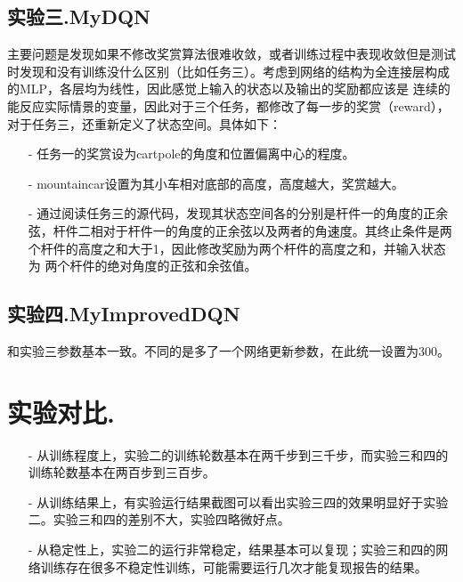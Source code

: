 \documentclass[a4paper,UTF8]{article}
\theoremstyle{definition}
\begin{document}
    \subsection{实验三.MyDQN}
    主要问题是发现如果不修改奖赏算法很难收敛，或者训练过程中表现收敛但是测试时发现和没有训练没什么区别（比如任务三）。考虑到网络的结构为全连接层构成的MLP，各层均为线性，因此感觉上输入的状态以及输出的奖励都应该是
    连续的能反应实际情景的变量，因此对于三个任务，都修改了每一步的奖赏（reward），对于任务三，还重新定义了状态空间。具体如下：
    \begin{itemize}
    \item[-] 任务一的奖赏设为cartpole的角度和位置偏离中心的程度。
    \item[-] mountaincar设置为其小车相对底部的高度，高度越大，奖赏越大。
    \item[-] 通过阅读任务三的源代码，发现其状态空间各的分别是杆件一的角度的正余弦，杆件二相对于杆件一的角度的正余弦以及两者的角速度。其终止条件是两个杆件的高度之和大于1，因此修改奖励为两个杆件的高度之和，并输入状态为
    两个杆件的绝对角度的正弦和余弦值。
    \end{itemize}
    \subsection{实验四.MyImprovedDQN}
    和实验三参数基本一致。不同的是多了一个网络更新参数，在此统一设置为300。
    
\section{实验对比.}

    \begin{itemize}
    
    \item[-] 从训练程度上，实验二的训练轮数基本在两千步到三千步，而实验三和四的训练轮数基本在两百步到三百步。
    \item[-] 从训练结果上，有实验运行结果截图可以看出实验三四的效果明显好于实验二。实验三和四的差别不大，实验四略微好点。
    \item[-] 从稳定性上，实验二的运行非常稳定，结果基本可以复现；实验三和四的网络训练存在很多不稳定性训练，可能需要运行几次才能复现报告的结果。
    
    \end{itemize}
    
\end{document}
